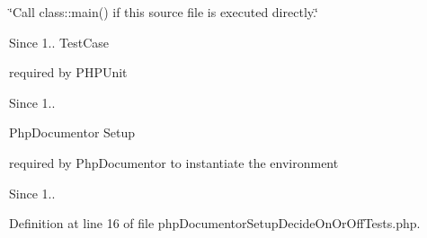 \char`\"{}\-Call class\-::main() if this source file is executed directly.\char`\"{} \begin{DoxySince}{\-Since}
1.. \-Test\-Case
\end{DoxySince}
required by \-P\-H\-P\-Unit \begin{DoxySince}{\-Since}
1..
\end{DoxySince}
\-Php\-Documentor \-Setup

required by \-Php\-Documentor to instantiate the environment \begin{DoxySince}{\-Since}
1.. 
\end{DoxySince}


\-Definition at line 16 of file php\-Documentor\-Setup\-Decide\-On\-Or\-Off\-Tests.\-php.

